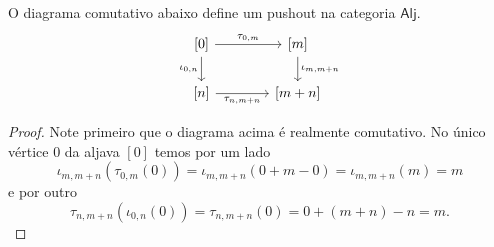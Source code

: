\begin{lema}\label{lema:pushout_aljavas_ordinais}
    O diagrama comutativo abaixo define um pushout na categoria $\mathsf{Alj}$.
    \begin{equation}\label{eq:pushout_aljavas_ordinais_diag}
        \begin{tikzcd}[column sep=1.35cm]
            {[0]}
            \arrow[r,"{\tau_{0,m}}"]
            \arrow[d, "{\iota_{0,n}}" swap]
            & {[m]}
            \arrow[d, "{\iota_{m,m+n}}"]
            \\ {[n]}
            \arrow[r, "{\tau_{n,m+n}}" swap]
            & {[m+n]}
        \end{tikzcd}
    \end{equation}
\end{lema}

\begin{proof}
    Note primeiro que o diagrama acima é realmente comutativo.
    No único vértice $0$ da aljava $[0]$ temos por um lado
    \begin{displaymath}
        \iota_{m,m+n}(\tau_{0,m}(0))
        = \iota_{m,m+n}(0+m-0)
        = \iota_{m,m+n}(m)
        = m
    \end{displaymath}
    e por outro
    \begin{displaymath}
        \tau_{n,m+n}(\iota_{0,n}(0))
        = \tau_{n,m+n}(0)
        = 0 + (m+n) - n
        = m.
    \end{displaymath}
    

\end{proof}
